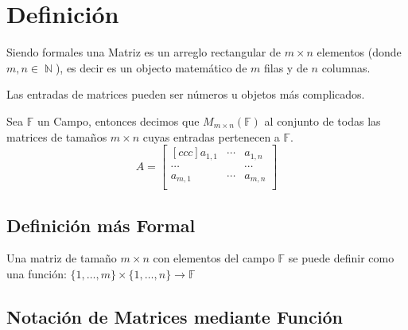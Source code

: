 \documentclass[12pt]{report}                                    %
\DeclareMathOperator \Naturals  {\mathbb{N}}                     %
\begin{document}
        \clearpage
        \section{Definición}

            Siendo formales una Matriz es un arreglo rectangular de $m \times n$ elementos 
            (donde $m,n \in \Naturals$), es decir es un objecto matemático de $m$ filas y
            de $n$ columnas.

            Las entradas de matrices pueden ser números u objetos más complicados.
            
            Sea $\mathbb{F}$ un Campo, entonces decimos que $M_{m \times n}(\mathbb{F})$
            al conjunto de todas las matrices de tamaños $m \times n$ cuyas entradas
            pertenecen a $\mathbb{F}$.
            \begin{equation}
                A = 
                \begin{bmatrix}[ccc]
                    a _{1, 1}   & \cdots & a_{1,n}   \\
                    \cdots      &        & \cdots    \\
                    a _{m, 1}   & \cdots & a_{m,n}   \\
                \end{bmatrix}
            \end{equation}


            \subsection*{Definición más Formal}
                Una matriz de tamaño $m \times n$ con elementos del campo $\mathbb{F}$ se puede
                definir como una función: 
                $\{1, \dots, m\} \times \{1, \dots , n\} \to \mathbb{F}$



            \subsection{Notación de Matrices mediante Función}
\end{document}
